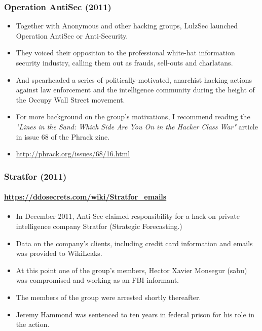\documentclass[aspectratio=169,usenames,dvipsnames]{beamer}
\begin{document}
\begin{frame}
  \frametitle{Operation AntiSec (2011)}

  \begin{itemize}[<+->]
    \item Together with Anonymous and other hacking groups, LulzSec launched
      Operation AntiSec or Anti-Security.
    \item They voiced their opposition to the professional white-hat
      information security industry, calling them out as frauds, sell-outs
      and charlatans.
    \item And spearheaded a series of politically-motivated, anarchist
      hacking actions against law enforcement and the intelligence community
      during the height of the Occupy Wall Street movement.
    \item For more background on the group's motivations, I recommend
      reading the \emph{"Lines in the Sand: Which Side Are You On in the
      Hacker Class War"} article in issue 68 of the Phrack zine.
    \item \url{http://phrack.org/issues/68/16.html}
  \end{itemize}

\end{frame}

\begin{frame}
  \frametitle{Stratfor (2011)}
  \framesubtitle{\url{https://ddosecrets.com/wiki/Stratfor_emails}}

  \begin{itemize}[<+->]
    \item In December 2011, Anti-Sec claimed responsibility for a hack on
      private intelligence company Stratfor (Strategic Forecasting.)
    \item Data on the company's clients, including credit card information and
      emails was provided to WikiLeaks.
    \item At this point one of the group's members, Hector Xavier Monsegur
      (sabu) was compromised and working as an FBI informant.
    \item The members of the group were arrested shortly thereafter.
    \item Jeremy Hammond was sentenced to ten years in federal prison for his
      role in the action.
  \end{itemize}

\end{frame}
\end{document}
